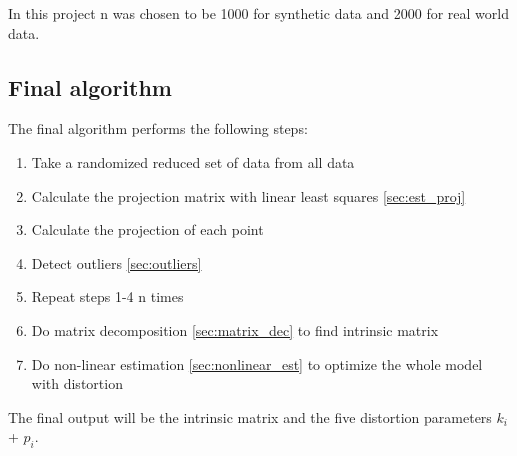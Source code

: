 \documentclass[11pt,a4paper,titlepage,oneside]{report}
\begin{document}
In this project n was chosen to be 1000 for synthetic data and 2000 for real world data.

\subsection{Final algorithm}
The final algorithm performs the following steps:
\begin{enumerate}
	\item Take a randomized reduced set of data from all data
	\item Calculate the projection matrix with linear least squares \ref{sec:est_proj}
	\item Calculate the projection of each point
	\item Detect outliers \ref{sec:outliers}
	\item Repeat steps 1-4 n times
	\item Do matrix decomposition \ref{sec:matrix_dec} to find intrinsic matrix
	\item Do non-linear estimation \ref{sec:nonlinear_est} to optimize the whole model with distortion
\end{enumerate}

The final output will be the intrinsic matrix and the five distortion parameters $k_i$ + $p_i$.
\end{document}
